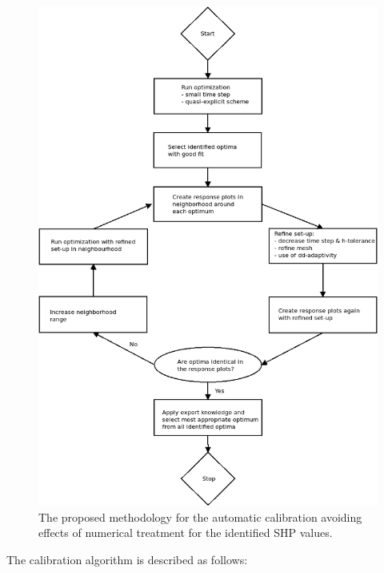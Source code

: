 \documentclass[review,times,3p,10pt]{elsarticle}
\begin{document}
\begin{figure}
\centering
\includegraphics[width=12cm]{flowchart/Flow_chart_cb_new.png}
\caption{The proposed methodology for the automatic calibration avoiding effects of numerical treatment for the identified SHP values.}
\label{flowchart}
\end{figure}

The calibration algorithm is described as follows:
\end{document}
